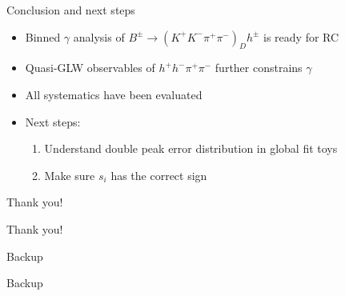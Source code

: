\documentclass{beamer}
\begin{document}
\begin{frame}{Conclusion and next steps}
  \begin{itemize}
    \setlength\itemsep{2em}
    \item{Binned $\gamma$ analysis of $B^\pm\to(K^+K^-\pi^+\pi^-)_Dh^\pm$ is ready for RC}
    \item{Quasi-GLW observables of $h^+h^-\pi^+\pi^-$ further constrains $\gamma$}
    \item{All systematics have been evaluated}
    \item{Next steps:}
    \begin{enumerate}
      \item{Understand double peak error distribution in global fit toys}
      \item{Make sure $s_i$ has the correct sign}
    \end{enumerate}
  \end{itemize}
\end{frame}

\begin{frame}{Thank you!}
  \begin{center}
    {\huge Thank you!}
  \end{center}
\end{frame}

\begin{frame}{Backup}
  \begin{center}
    {\huge Backup}
  \end{center}
\end{frame}
\end{document}
